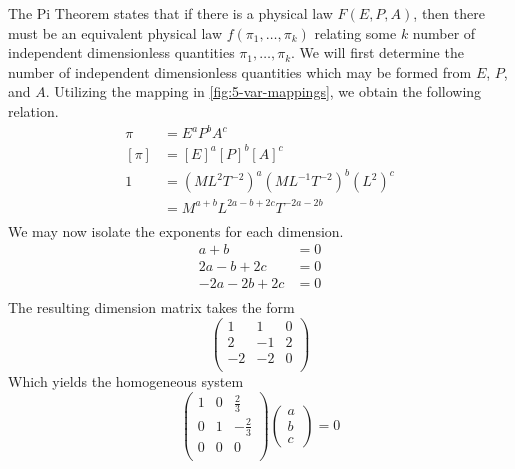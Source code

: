 \documentclass[12pt,twoside]{article}
\begin{document}
  The Pi Theorem states that if there is a physical law $F(E, P, A)$, then there
  must be an equivalent physical law $f(\pi_1, \ldots, \pi_k)$ relating some $k$
  number of independent dimensionless quantities $\pi_1,\ldots,\pi_k$. We will
  first determine the number of independent dimensionless quantities which may
  be formed from $E$, $P$, and $A$. Utilizing the mapping in
  \cref{fig:5-var-mappings}, we obtain the following relation.
  \begin{equation*}
    \begin{aligned}
      \pi &= {E}^a{P}^b{A}^c \\
      [\pi] &= {[E]}^a{[P]}^b{[A]}^c \\
      1 &= {(ML^2T^{-2})}^a{(ML^{-1}T^{-2})}^b{(L^2)}^c \\
      &= M^{a+b}L^{2a-b+2c}T^{-2a-2b} \\
    \end{aligned}
  \end{equation*}
  We may now isolate the exponents for each dimension.
  \begin{equation*}
    \begin{aligned}
      a + b &= 0 \\
      2a - b + 2c &= 0 \\
      -2a - 2b + 2c &= 0 \\
    \end{aligned}
  \end{equation*}
  The resulting dimension matrix takes the form
  \begin{equation*}
    \begin{pmatrix}
      1 & 1 & 0 \\
      2 & -1 & 2 \\
      -2 & -2 & 0 \\
    \end{pmatrix}
  \end{equation*}
  Which yields the homogeneous system
  \begin{equation*}
    \begin{pmatrix}
      1 & 0 & \frac{2}{3} \\
      0 & 1 & -\frac{2}{3} \\
      0 & 0 & 0 \\
    \end{pmatrix}
    \begin{pmatrix}
      a \\ b \\ c \
    \end{pmatrix} = 0
  \end{equation*}
\end{document}
